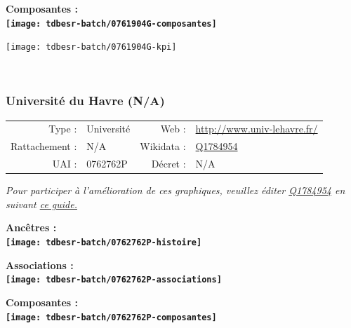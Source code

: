 \documentclass[12pt,french,]{article}
\begin{document}
\hrulefill

\begin{center} \bf Composantes : \\  
\texttt{[image: tdbesr-batch/0761904G-composantes]} \end{center}

\begin{center}\texttt{[image: tdbesr-batch/0761904G-kpi]} \end{center}\checkoddpage

\ifoddpage ~\newpage \fi   

\hypertarget{universituxe9-du-havre-na}{%
\subsubsection{Université du Havre
(N/A)}\label{universituxe9-du-havre-na}}

\begin{tabular*}{\textwidth}{rp{5cm}rl}  
\hline  
Type : & Université & Web : &\href{http://www.univ-lehavre.fr/}{http://www.univ-lehavre.fr/} \\  
Rattachement : & N/A & Wikidata : & \href{https://www.wikidata.org/entity/Q1784954}{Q1784954} \\  
UAI : & 0762762P & Décret : & N/A \\  
\hline  
\end{tabular*}

\textit{\scriptsize Pour participer à l'amélioration de ces graphiques, veuillez éditer  \href{https://www.wikidata.org/entity/Q1784954}{Q1784954}  en suivant \href{https://github.com/cpesr/wikidataESR/blob/master/Rmd/wikidataESR.md}{ce guide.}}

\vspace{1cm}  
\begin{minipage}[b]{0.50\textwidth}\begin{center} \bf Ancêtres : \\  
\texttt{[image: tdbesr-batch/0762762P-histoire]} \end{center}\end{minipage}\begin{minipage}[b]{0.50\textwidth}\begin{center} \bf Associations : \\  
\texttt{[image: tdbesr-batch/0762762P-associations]} \end{center}\end{minipage}

\hrulefill

\begin{center} \bf Composantes : \\  
\texttt{[image: tdbesr-batch/0762762P-composantes]} \end{center}
\end{document}
